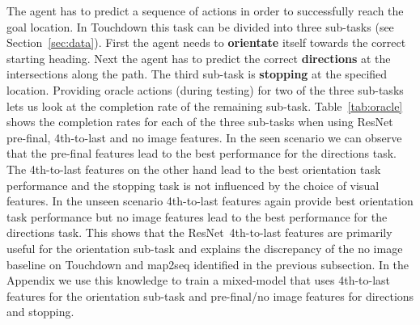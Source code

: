 \documentclass[11pt]{article}
\begin{document}
 The agent has to predict a sequence of actions in order to successfully reach the goal location. In Touchdown this task can be divided into three sub-tasks (see Section~\ref{sec:data}). First the agent needs to \textbf{orientate} itself towards the correct starting heading. Next the agent has to predict the correct \textbf{directions} at the intersections along the path. The third sub-task is \textbf{stopping} at the specified location. Providing oracle actions (during testing) for two of the three sub-tasks lets us look at the completion rate of the remaining sub-task. Table~\ref{tab:oracle} shows the completion rates for each of the three sub-tasks when using ResNet pre-final, 4th-to-last and no image features. In the seen scenario we can observe that the pre-final features lead to the best performance for the directions task. The 4th-to-last features on the other hand lead to the best orientation task performance and the stopping task is not influenced by the choice of visual features. In the unseen scenario 4th-to-last features again provide best orientation task performance but no image features lead to the best performance for the directions task. This shows that the ResNet~4th-to-last features are primarily useful for the orientation sub-task and explains the discrepancy of the no image baseline on Touchdown and map2seq identified in the previous subsection. In the Appendix we use this knowledge to train a mixed-model that uses 4th-to-last features for the orientation sub-task and pre-final/no image features for directions and stopping.
\end{document}
